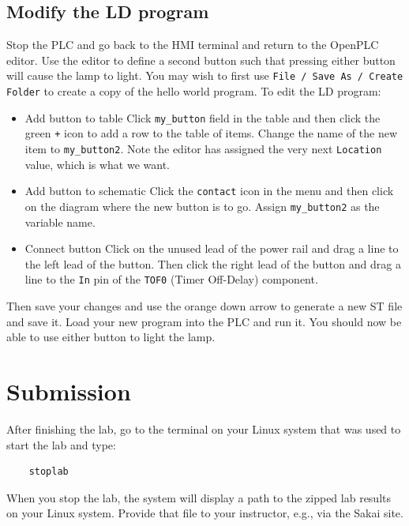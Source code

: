\subsection{Modify the LD program}
Stop the PLC and go back to the HMI terminal and return to the OpenPLC editor.  Use the editor to define a second button
such that pressing either button will cause the lamp to light. You may wish to first use {\tt File / Save As / Create Folder} 
to create a copy of the hello world program.  To edit the LD program:
\begin{itemize}
\item{Add button to table} Click {\tt my\_button} field in the table and then click the green {\tt +} icon to add 
a row to the table of items. Change the name of the new item to {\tt my\_button2}.  Note the editor has assigned the very next
{\tt Location} value, which is what we want.
\item{Add button to schematic} Click the {\tt contact} icon in the menu and then click on the diagram where the new button is to go.
Assign {\tt my\_button2} as the variable name.
\item{Connect button} Click on the unused lead of the power rail and drag a line to the left lead of the button.  Then click the 
right lead of the button and drag a line to the {\tt In} pin of the {\tt TOF0} (Timer Off-Delay) component.
\end{itemize}
Then save your changes and use the orange down arrow to generate a new ST file and save it.
Load your new program into the PLC and run it.  You should now be able to use either button to light the lamp.

\section{Submission}
After finishing the lab, go to the terminal on your Linux system that was used to start the lab and type:
\begin{verbatim}
    stoplab 
\end{verbatim}
When you stop the lab, the system will display a path to the zipped lab results on your Linux system.  Provide that file to 
your instructor, e.g., via the Sakai site.


